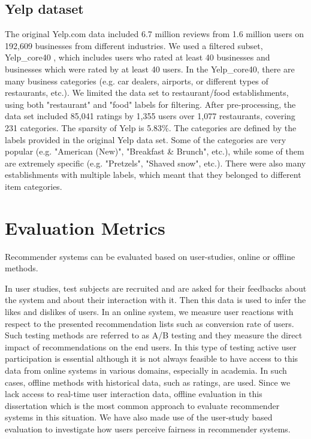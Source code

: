     \subsection{Yelp dataset}
    The original Yelp.com data included 6.7 million reviews from 1.6 million users on 192,609 businesses from different industries. We used a filtered subset, Yelp\_core40 \cite{mansoury2019bias}, which includes users who rated at least 40 businesses and businesses which were rated by at least 40 users. In the Yelp\_core40, there are many business categories  (e.g. car dealers, airports, or different types of restaurants, etc.). We limited the data set to restaurant/food establishments, using both "restaurant" and "food" labels for filtering. After pre-processing, the data set included 85,041 ratings by 1,355 users over 1,077 restaurants, covering 231 categories. The sparsity of Yelp is 5.83\%. The categories are defined by the labels provided in the original Yelp data set. Some of the categories are very popular (e.g. "American (New)", "Breakfast \& Brunch", etc.), while some of them are extremely specific (e.g. "Pretzels", "Shaved snow", etc.). There were also many establishments with multiple labels, which meant that they belonged to different item categories.



\section{Evaluation Metrics}
\label{sec:eval}
    
    Recommender systems can be evaluated based on user-studies, online or offline methods.
    
    In user studies, test subjects are recruited and are asked for their feedbacks about the system and about their interaction with it. Then this data is used to infer the likes and dislikes of users. 
    In an online system, we measure user reactions with respect to the presented recommendation lists such as conversion rate of users. Such testing methods are referred to as A/B testing and they measure the direct impact of recommendations on the end users. In this type of testing active user participation is essential although it is not always feasible to have access to this data from online systems in various domains, especially in academia. In such cases, offline methods with historical data, such as ratings, are used. Since we lack access to real-time user interaction data, offline evaluation in this dissertation which is the most common approach to evaluate recommender systems in this situation. We have also made use of the user-study based evaluation to investigate  how users perceive fairness in recommender systems.
    
